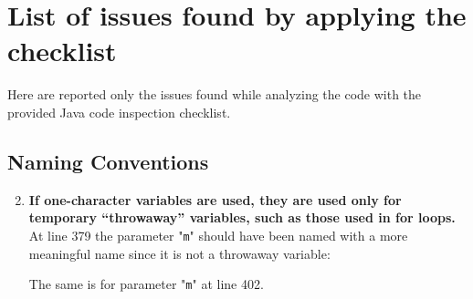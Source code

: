 \documentclass[a4paper,11pt]{report} %
\begin{document}
	
	
	
	\section{List of issues found by applying the checklist} Here are reported only the issues found while analyzing the code with the provided Java code inspection checklist.
		\subsection*{Naming Conventions}\begin{enumerate}[resume]
			\setcounter{enumi}{1}	
			\item \textbf{If one-character variables are used, they are used only for temporary ``throwaway'' variables, such as those used in for loops.}\smallskip \\
				At line 379 the parameter "\texttt{m}" should have been named with a more meaningful name since it is not a throwaway variable: \\
				\begin{minipage}{\linewidth}
				
				\end{minipage}
				The same is for parameter "\texttt{m}" at line 402.
			

\end{enumerate}
\end{document}
